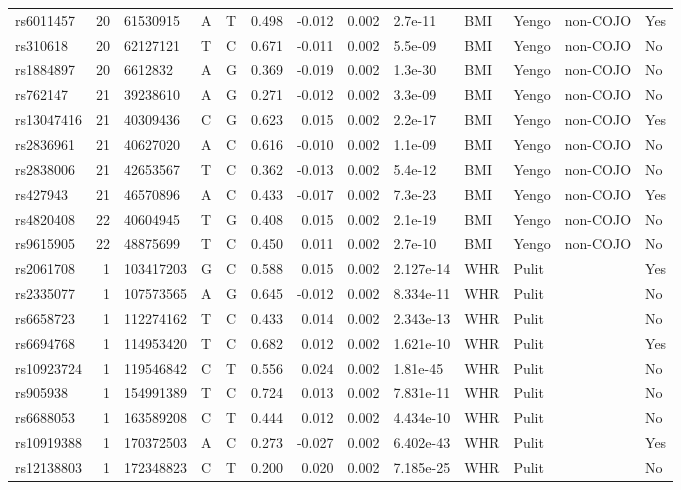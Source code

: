 \documentclass[11pt,twoside]{bristolthesis}
\begin{document}
\begin{longtable}[t]{lrlllrrrlllll}
rs6011457 & 20 & 61530915 & A & T & 0.498 & -0.012 & 0.002 & 2.7e-11 & BMI & Yengo & non-COJO & Yes\\
rs310618 & 20 & 62127121 & T & C & 0.671 & -0.011 & 0.002 & 5.5e-09 & BMI & Yengo & non-COJO & No\\
rs1884897 & 20 & 6612832 & A & G & 0.369 & -0.019 & 0.002 & 1.3e-30 & BMI & Yengo & non-COJO & No\\
\addlinespace
rs762147 & 21 & 39238610 & A & G & 0.271 & -0.012 & 0.002 & 3.3e-09 & BMI & Yengo & non-COJO & No\\
rs13047416 & 21 & 40309436 & C & G & 0.623 & 0.015 & 0.002 & 2.2e-17 & BMI & Yengo & non-COJO & Yes\\
rs2836961 & 21 & 40627020 & A & C & 0.616 & -0.010 & 0.002 & 1.1e-09 & BMI & Yengo & non-COJO & No\\
rs2838006 & 21 & 42653567 & T & C & 0.362 & -0.013 & 0.002 & 5.4e-12 & BMI & Yengo & non-COJO & No\\
rs427943 & 21 & 46570896 & A & C & 0.433 & -0.017 & 0.002 & 7.3e-23 & BMI & Yengo & non-COJO & Yes\\
\addlinespace
rs4820408 & 22 & 40604945 & T & G & 0.408 & 0.015 & 0.002 & 2.1e-19 & BMI & Yengo & non-COJO & No\\
rs9615905 & 22 & 48875699 & T & C & 0.450 & 0.011 & 0.002 & 2.7e-10 & BMI & Yengo & non-COJO & No\\
rs2061708 & 1 & 103417203 & G & C & 0.588 & 0.015 & 0.002 & 2.127e-14 & WHR & Pulit &  & Yes\\
rs2335077 & 1 & 107573565 & A & G & 0.645 & -0.012 & 0.002 & 8.334e-11 & WHR & Pulit &  & No\\
rs6658723 & 1 & 112274162 & T & C & 0.433 & 0.014 & 0.002 & 2.343e-13 & WHR & Pulit &  & No\\
\addlinespace
rs6694768 & 1 & 114953420 & T & C & 0.682 & 0.012 & 0.002 & 1.621e-10 & WHR & Pulit &  & Yes\\
rs10923724 & 1 & 119546842 & C & T & 0.556 & 0.024 & 0.002 & 1.81e-45 & WHR & Pulit &  & No\\
rs905938 & 1 & 154991389 & T & C & 0.724 & 0.013 & 0.002 & 7.831e-11 & WHR & Pulit &  & No\\
rs6688053 & 1 & 163589208 & C & T & 0.444 & 0.012 & 0.002 & 4.434e-10 & WHR & Pulit &  & No\\
rs10919388 & 1 & 170372503 & A & C & 0.273 & -0.027 & 0.002 & 6.402e-43 & WHR & Pulit &  & Yes\\
\addlinespace
rs12138803 & 1 & 172348823 & C & T & 0.200 & 0.020 & 0.002 & 7.185e-25 & WHR & Pulit &  & No\\

\end{longtable}
\end{document}
